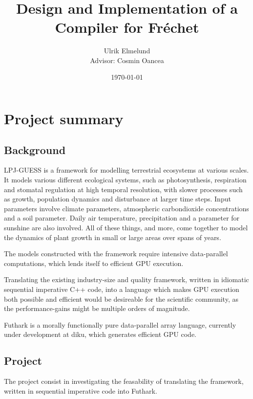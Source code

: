 
\author{Ulrik Elmelund\\ {\small{} Advisor: Cosmin Oancea}}
\date{\today}
\title{Design and Implementation of a Compiler for Fréchet}


\section*{Project summary}
\subsection*{Background}
LPJ-GUESS is a framework for modelling terrestrial ecosystems at various scales.\cite{smith2001lpj} It models various different ecological systems, such as photosynthesis, respiration and stomatal regulation at high temporal resolution, with slower processes such as growth, population dynamics and disturbance at larger time steps. Input parameters involve climate parameters, atmospheric carbondioxide concentrations and a soil parameter. Daily air temperature, precipitation and a parameter for sunshine are also involved. All of these things, and more, come together to model the dynamics of plant growth in small or large areas over spans of years.

The models constructed with the framework require intensive data-parallel computations, which lends itself to efficient GPU execution.

Translating the existing industry-size and quality framework, written in idiomatic sequential imperative C++ code, into a language which makes GPU execution both possible and efficient would be desireable for the scientific community, as the performance-gains might be multiple orders of magnitude.

Futhark is a morally functionally pure data-parallel array language, currently under development at diku, which generates efficient GPU code\cite{futhark}.

\subsection*{Project}
The project consist in investigating the feasability of translating the framework, written in sequential imperative code into Futhark.

